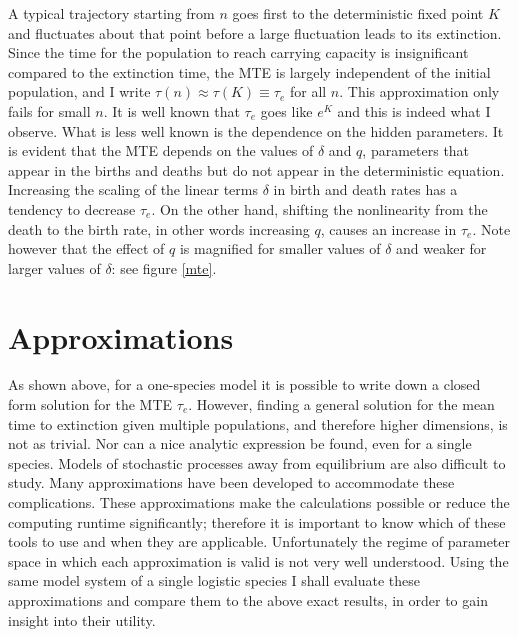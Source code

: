A typical trajectory starting from $n$ goes first to the deterministic fixed point $K$ and fluctuates about that point before a large fluctuation leads to its extinction. 
Since the time for the population to reach carrying capacity is insignificant compared to the extinction time, the MTE is largely independent of the initial population, and I write $\tau(n) \approx \tau(K) \equiv \tau_e$ for all $n$. 
This approximation only fails for small $n$. %
It is well known that $\tau_e$ goes like $e^K$ \cite{Ovaskainen2010} and this is indeed what I observe. %
What is less well known is the dependence on the hidden parameters. 
It is evident that the MTE depends on the values of $\delta$ and $q$, parameters that appear in the births and deaths but do not appear in the deterministic equation. 
Increasing the scaling of the linear terms $\delta$ in birth and death rates has a tendency to decrease $\tau_e$. 
On the other hand, shifting the nonlinearity from the death to the birth rate, in other words increasing $q$, causes an increase in $\tau_e$. 
Note however that the effect of $q$ is magnified for smaller values of $\delta$ and weaker for larger values of $\delta$: see figure \ref{mte}. 


\section{Approximations}%

As shown above, for a one-species model it is possible to write down a closed form solution for the MTE $\tau_e$.
However, finding a general solution for the mean time to extinction given multiple populations, and therefore higher dimensions, is not as trivial. Nor can a nice analytic expression be found, even for a single species. 
Models of stochastic processes away from equilibrium are also difficult to study. 
Many approximations have been developed to accommodate these complications. 
These approximations make the calculations possible or reduce the computing runtime significantly; therefore it is important to know which of these tools to use and when they are applicable. 
Unfortunately the regime of parameter space in which each approximation is valid is not very well understood. 
Using the same model system of a single logistic species I shall evaluate these approximations and compare them to the above exact results, in order to gain insight into their utility. 

